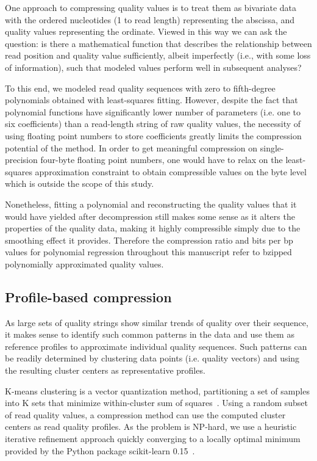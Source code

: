\documentclass{bioinfo}
\begin{document}
\begin{methods}
One approach to compressing quality values is to treat them as bivariate data with the ordered nucleotides (1 to read length) representing the abscissa, and quality values representing the ordinate. Viewed in this way we can ask the question: is there a mathematical function that describes the relationship between read position and quality value sufficiently, albeit imperfectly (i.e., with some loss of information), such that modeled values perform well in subsequent analyses? 

To this end, we modeled read quality sequences with zero to fifth-degree polynomials obtained with least-squares fitting. However, despite the fact that polynomial functions have significantly lower number of parameters (i.e. one to six coefficients) than a read-length string of raw quality values, the necessity of using floating point numbers to store coefficients greatly limits the compression potential of the method. In order to get meaningful compression on single-precision four-byte floating point numbers, one would have to relax on the least-squares approximation constraint to obtain compressible values on the byte level which is outside the scope of this study.

Nonetheless, fitting a polynomial and reconstructing the quality values that it would have yielded after decompression still makes some sense as it alters the properties of the quality data, making it highly compressible simply due to the smoothing effect it provides. Therefore the compression ratio and bits per bp values for polynomial regression throughout this manuscript refer to bzipped polynomially approximated quality values.

\subsection{Profile-based compression}

As large sets of quality strings show similar trends of quality over their sequence, it makes sense to identify such common patterns in the data and use them as reference profiles to approximate individual quality sequences. Such patterns can be readily determined by clustering data points (i.e. quality vectors) and using the resulting cluster centers as representative profiles.

K-means clustering is a vector quantization method, partitioning a set of samples into K sets that minimize within-cluster sum of squares~\cite{macqueen1967some}. Using a random subset of read quality values, a compression method can use the computed cluster centers as read quality profiles. As the problem is NP-hard, we use a heuristic iterative refinement approach quickly converging to a locally optimal minimum provided by the Python package scikit-learn 0.15~\cite{scikit-learn}.


\end{methods}
\end{document}
